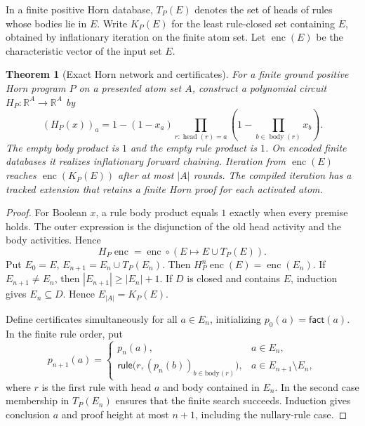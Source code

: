 \documentclass[11pt,a4paper]{article}
\newtheorem{theorem}{Theorem}[section]
\theoremstyle{definition}
\theoremstyle{remark}\newaliascnt{remark}{theorem}
\newcommand{\R}{\mathbb R}
\newcommand{\enc}{\operatorname{enc}}
\numberwithin{equation}{section}
\begin{document}
In a finite positive Horn database, \(T_P(E)\) denotes the set of heads of rules whose bodies lie in \(E\). Write \(K_P(E)\) for the least rule-closed set containing \(E\), obtained by inflationary iteration on the finite atom set. Let \(\enc(E)\) be the characteristic vector of the input set \(E\).
\begin{theorem}[Exact Horn network and certificates]\label{neural:thm:horn-network}
For a finite ground positive Horn program $P$ on a presented atom set $A$, construct a polynomial circuit $H_P:\R^A\to\R^A$ by
\begin{equation}\label{neural:eq:horn-network}
 (H_P(x))_a=1-(1-x_a)
   \prod_{r:\operatorname{head}(r)=a}
      \left(1-\prod_{b\in\operatorname{body}(r)}x_b\right).
\end{equation}
The empty body product is $1$ and the empty rule product is $1$. On encoded finite databases it realizes inflationary forward chaining. Iteration from $\enc(E)$ reaches $\enc(K_P(E))$ after at most $|A|$ rounds. The compiled iteration has a tracked extension that retains a finite Horn proof for each activated atom.
\end{theorem}
\begin{proof}
For Boolean $x$, a rule body product equals $1$ exactly when every premise holds. The outer expression is the disjunction of the old head activity and the body activities. Hence
\[
H_P\enc=\enc\circ(E\mapsto E\cup T_P(E)).
\]
Put \(E_0=E\), \(E_{n+1}=E_n\cup T_P(E_n)\). Then \(H_P^n\enc(E)=\enc(E_n)\). If \(E_{n+1}\ne E_n\), then \(|E_{n+1}|\ge |E_n|+1\). If \(D\) is closed and contains \(E\), induction gives \(E_n\subseteq D\). Hence \(E_{|A|}=K_P(E)\).

Define certificates simultaneously for all \(a\in E_n\), initializing \(p_0(a)=\mathsf{fact}(a)\). In the finite rule order, put
\[
 p_{n+1}(a)=
 \begin{cases}
 p_n(a),&a\in E_n,\\
 \mathsf{rule}\bigl(r,(p_n(b))_{b\in\mathrm{body}(r)}\bigr),
       &a\in E_{n+1}\setminus E_n,
 \end{cases}
\]
where \(r\) is the first rule with head \(a\) and body contained in \(E_n\). In the second case membership in \(T_P(E_n)\) ensures that the finite search succeeds. Induction gives conclusion \(a\) and proof height at most \(n+1\), including the nullary-rule case.
\end{proof}
\end{document}
